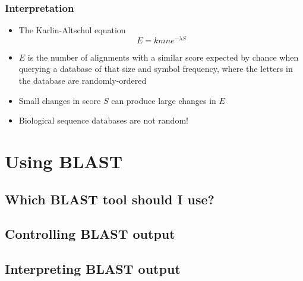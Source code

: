 \documentclass[table]{beamer}
\begin{document}
    \begin{frame}
     \frametitle{Interpretation}
     \begin{itemize}
       \item The Karlin-Altschul equation
       \begin{equation*}
         E = k m n e^{-\lambda S}
       \end{equation*}
       \item $E$ is the number of alignments with a similar score expected by chance when querying a database of that size and symbol frequency, where the letters in the database are randomly-ordered
       \item Small changes in score $S$ can produce large changes in $E$
       \item Biological sequence databases are not random!
     \end{itemize}
    \end{frame} 

  
  \section{Using BLAST}
    \subsection{Which BLAST tool should I use?}
    \begin{frame}
     \frametitle{}
    \end{frame}

    \subsection{Controlling BLAST output}
    \begin{frame}
     \frametitle{}
    \end{frame}
     
    \subsection{Interpreting BLAST output}
    \begin{frame}
     \frametitle{}
    \end{frame}
    
\end{document}
